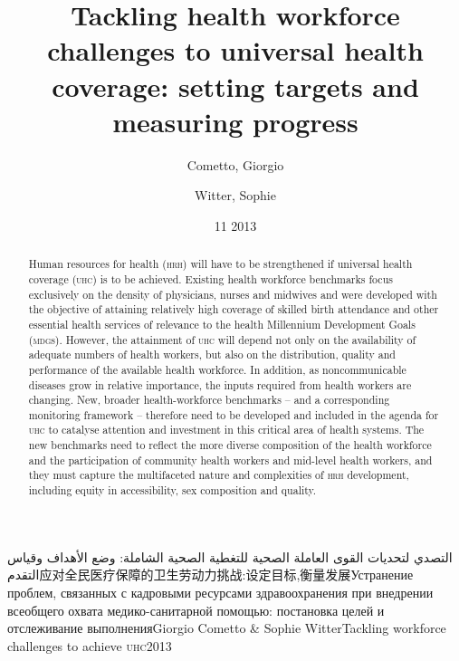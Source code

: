 \documentclass{article}
\title{Tackling health workforce challenges to universal health coverage:
setting targets
and measuring progress\titlegroup{}}
\author[{a}]{Cometto, Giorgio}
\author[{b}]{Witter, Sophie}
\affil[a]{World Health Organization}
\affil[b]{Queen Margaret University}
\date{ 11 2013}
\begin{document}
\newcommand{\lingua}{Português}

\maketitle
\tableofcontents

التصدي
لتحديات القوى
العاملة
الصحية
للتغطية
الصحية
الشاملة: وضع
الأهداف وقياس
التقدم应对全民医疗保障的卫生劳动力挑战:设定目标,衡量发展Устранение
проблем,
связанных с
кадровыми
ресурсами
здравоохранения
при внедрении
всеобщего
охвата
медико-санитарной
помощью:
постановка
целей и
отслеживание
выполненияGiorgio Cometto \& Sophie WitterTackling workforce challenges to
achieve
\textsc{uhc}2013
\begingroup
\renewcommand{\section}[1]{\subsection*{#1}}

\begin{abstract}

Human resources for health (\textsc{hrh}) will have to be strengthened if universal
health coverage (\textsc{uhc})
is to be achieved. Existing health workforce benchmarks focus exclusively on the
density of
physicians, nurses and midwives and were developed with the objective of
attaining relatively high
coverage of skilled birth attendance and other essential health services of
relevance to the health
Millennium Development Goals (\textsc{mdg}s). However, the attainment of \textsc{uhc} will depend
not only on the
availability of adequate numbers of health workers, but also on the
distribution, quality and
performance of the available health workforce. In addition, as noncommunicable
diseases grow in
relative importance, the inputs required from health workers are changing. New,
broader
health-workforce benchmarks – and a corresponding monitoring framework –
therefore
need to be developed and included in the agenda for \textsc{uhc} to catalyse attention
and investment in this
critical area of health systems. The new benchmarks need to reflect the more
diverse composition of
the health workforce and the participation of community health workers and
mid-level health workers,
and they must capture the multifaceted nature and complexities of \textsc{hrh}
development, including equity
in accessibility, sex composition and quality.

\end{abstract}
\endgroup
\end{document}
